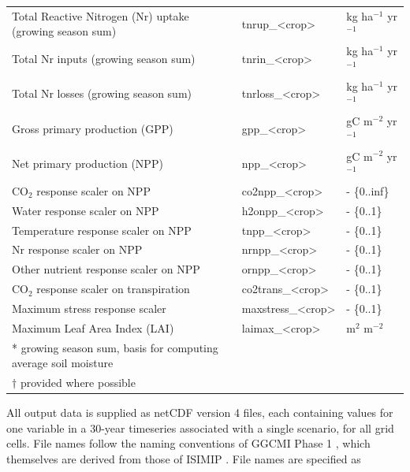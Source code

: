 \documentclass[gmd, manuscript]{copernicus} %
\begin{document}
\begin{table}[]
\begin{tabular}{lll}
    Total Reactive Nitrogen (Nr) uptake (growing season sum) & tnrup\_<crop>     & kg ha$^{-1}$ yr$^{-1}$              \\
    Total Nr inputs (growing season sum)                     & tnrin\_<crop>     & kg ha$^{-1}$ yr$^{-1}$              \\
    Total Nr losses (growing season sum)                     & tnrloss\_<crop>   & kg ha$^{-1}$ yr$^{-1}$              \\
    Gross primary production (GPP)                           & gpp\_<crop>       & gC m$^{-2}$ yr$^{-1}$               \\
    Net primary production (NPP)                             & npp\_<crop>       & gC m$^{-2}$ yr$^{-1}$               \\
    CO$_2$ response scaler on NPP                            & co2npp\_<crop>    & - \{0..inf\}                \\
    Water response scaler on NPP                             & h2onpp\_<crop>    & - \{0..1\}                  \\
    Temperature response scaler on NPP                       & tnpp\_<crop>      & - \{0..1\}                  \\
    Nr response scaler on NPP                                & nrnpp\_<crop>     & - \{0..1\}                  \\
    Other nutrient response scaler on NPP                    & ornpp\_<crop>     & - \{0..1\}                  \\
    CO$_2$ response scaler on transpiration                  & co2trans\_<crop>  & - \{0..1\}                  \\
    Maximum stress response scaler                           & maxstress\_<crop> & - \{0..1\}                  \\
    Maximum Leaf Area Index (LAI)                            & laimax\_<crop>    & m$^{2}$ m$^{-2}$           \\        
    \bottomhline
    * growing season sum, basis for computing average soil moisture & {} & {} \\
    $\dagger$ provided where possible & {} & {} \\
  \end{tabular}
\end{table}

All output data is supplied as netCDF version 4 files, each containing values for one variable in a 30-year timeseries associated with a single scenario, for all grid cells. File names follow the naming conventions of GGCMI Phase 1 \citep{Elliott2015}, which themselves are derived from those of ISIMIP \citep{frieler2017assessing}. 
File names are specified as 
\end{document}
